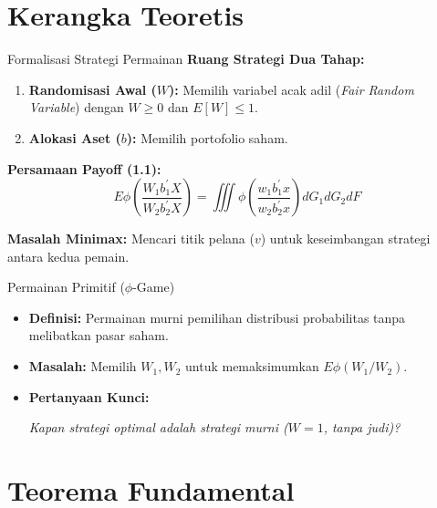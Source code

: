 \documentclass{beamer}
\begin{document}
\section{Kerangka Teoretis}

\begin{frame}{Formalisasi Strategi Permainan}
    \textbf{Ruang Strategi Dua Tahap:}
    \begin{enumerate}
        \item \textbf{Randomisasi Awal ($W$):} Memilih variabel acak adil (\textit{Fair Random Variable}) dengan $W \ge 0$ dan $E[W] \le 1$.
        \item \textbf{Alokasi Aset ($b$):} Memilih portofolio saham.
    \end{enumerate}
    
    \vspace{0.5cm}
    \textbf{Persamaan Payoff (1.1):}
    $$E \phi\left(\frac{W_{1}b_{1}^{\prime}X}{W_{2}b_{2}^{\prime}X}\right) = \iiint \phi\left(\frac{w_{1}b_{1}^{\prime}x}{w_{2}b_{2}^{\prime}x}\right) dG_{1} dG_{2} dF$$
    
    \vspace{0.5cm}
    \textbf{Masalah Minimax:}
    Mencari titik pelana ($v$) untuk keseimbangan strategi antara kedua pemain.
\end{frame}

\begin{frame}{Permainan Primitif ($\phi$-Game)}
    \begin{itemize}
        \item \textbf{Definisi:} Permainan murni pemilihan distribusi probabilitas tanpa melibatkan pasar saham.
        \item \textbf{Masalah:} Memilih $W_1, W_2$ untuk memaksimumkan $E\phi(W_1/W_2)$.
        \item \textbf{Pertanyaan Kunci:}
        \begin{center}
            \textit{Kapan strategi optimal adalah strategi murni ($W=1$, tanpa judi)?}
        \end{center}
    \end{itemize}
\end{frame}

\section{Teorema Fundamental}
\end{document}
